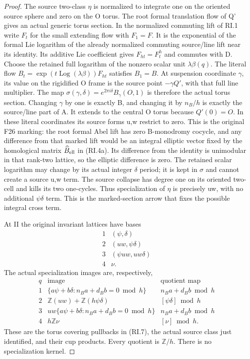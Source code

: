 \begin{proof}
The source two-class \(\eta\) is normalized to integrate one on the oriented
source sphere and zero on the O torus. The root formal translation flow of Q' gives an actual generic torus
section. In the normalized commuting lift of RI.1 write \(F_t\) for the
small extending flow with \(F_1=F\). It is the exponential of the formal
Lie logarithm of the already normalized commuting source/line lift near
its identity. Its additive Lie coefficient gives \(F_{ht}=F_t^h\) and
commutes with D. Choose the retained full logarithm
of the nonzero scalar unit \(\lambda\beta(q)\). The literal flow
\(B_t=\exp(t\operatorname{Log}(\lambda\beta))F_{ht}\) satisfies \(B_1=B\). At suspension
coordinate \(\gamma\), its value on the rigidified O frame is the source
point \(-\gamma Q'\), with that full line multiplier. The map
\(\sigma(\gamma,\delta)=e^{2\pi i\delta}B_\gamma(O,1)\) is therefore the actual
torus section.
Changing \(\gamma\) by one is exactly B, and changing it by \(n_B/h\) is exactly
the source/line part of A. It extends to the central O torus because
\(Q'(0)=O\). In these literal coordinates its source forms u,w restrict to zero.
This is the original F26 marking: the root formal Abel lift has zero
B-monodromy cocycle, and any difference from that marked lift would be
an integral elliptic vector fixed by the homological matrix \(\widehat B_{\rm ell}\)
in (RI.4a). Its difference from the identity is unimodular in that
rank-two lattice, so the elliptic difference is zero. The retained scalar logarithm may change by its actual integer
\(\delta\) period; it is kept in \(\sigma\) and cannot create a source u,w term. The source collapse has degree one on its oriented two-cell and
kills its two one-cycles. Thus specialization of \(\eta\) is precisely uw,
with no additional \(\psi\delta\) term. This is the marked-section arrow
that fixes the possible integral cross term.

At II the original invariant lattices have bases
\[
 \begin{array}{c|c}
 1&(\psi,\delta)\\
 2&(uw,\psi\delta)\\
 3&(\psi uw,uw\delta)\\
 4&\nu.
 \end{array}                                             \tag{RI.8}
\]
The actual specialization images are, respectively,
\[
 \begin{array}{c|c|c}
 q&\text{image}&\text{quotient map}\\\hline
 1&\{a\psi+b\delta:n_Ba+d_Bb=0\bmod h\}&n_Ba+d_Bb\bmod h\\
 2&\mathbb Z(uw)+\mathbb Z(h\psi\delta)&[\psi\delta]\bmod h\\
 3&uw\{a\psi+b\delta:n_Ba+d_Bb=0\bmod h\}&n_Ba+d_Bb\bmod h\\
 4&h\mathbb Z\nu&[\nu]\bmod h .
 \end{array}                                             \tag{RI.9}
\]
These are the torus covering pullbacks in (RI.7), the actual source
class just identified, and their cup products. Every quotient is \(\mathbb Z/h\).
There is no specialization kernel.


\end{proof}
